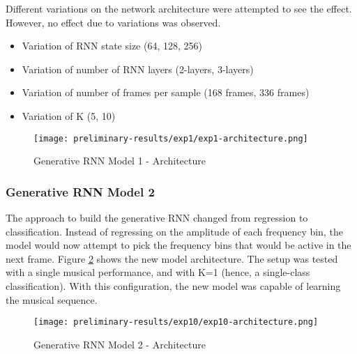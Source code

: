 \documentclass[../main.tex]{subfiles}
\begin{document}
\iffalse
 Figure \ref{fig:exp1-performance} shows the model loss when trained for 500 epochs.
\fi
 

\par
Different variations on the network architecture were attempted to see the effect. However, no effect due to variations was observed.
\begin{itemize}
    \item Variation of RNN state size (64, 128, 256)
    \item Variation of number of RNN layers (2-layers, 3-layers)
    \item Variation of number of frames per sample (168 frames, 336 frames)
    \item Variation of K (5, 10)
\end{itemize}



\begin{figure}[H]
    \centering
    \texttt{[image: preliminary-results/exp1/exp1-architecture.png]}
    \caption{Generative RNN Model 1 - Architecture}
    \label{fig:exp1-architecture}
\end{figure}


\iffalse
\begin{figure}[H]
    \centering
    \texttt{[image: preliminary-results/exp1/exp1-performance.png]}
    \caption{Generative RNN Model 1 - Performance}
    \label{fig:exp1-performance}
\end{figure}
\fi

\subsubsection{Generative RNN Model 2}

\par
The approach to build the generative RNN changed from regression to classification. Instead of regressing on the amplitude of each frequency bin, the model would now attempt to pick the frequency bins that would be active in the next frame. Figure \ref{fig:exp10-architecture} shows the new model architecture. The setup was tested with a single musical performance, and with K=1 (hence, a single-class classification). With this configuration, the new model was capable of learning the musical sequence. 
\iffalse
Figure \ref{fig:exp10-performance} shows the model loss when trained for 500 epochs.
\fi

\begin{figure}[H]
    \centering
    \texttt{[image: preliminary-results/exp10/exp10-architecture.png]}
    \caption{Generative RNN Model 2 - Architecture}
    \label{fig:exp10-architecture}
\end{figure}
\end{document}
